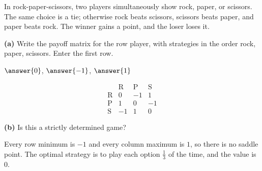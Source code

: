 \documentclass[12pt]{ximera}
\begin{document}
\begin{problem}
In rock-paper-scissors, two players simultaneously show rock, paper, or scissors. The same
choice is a tie; otherwise rock beats scissors, scissors beats paper, and paper beats rock.
The winner gains a point, and the loser loses it.

\begin{prompt}
\textbf{(a)} Write the payoff matrix for the row player, with strategies in the order
rock, paper, scissors. Enter the first row.

$\answer{0}$, $\answer{-1}$, $\answer{1}$
\begin{feedback}
\[
\begin{array}{r|rrr}
 & \text{R} & \text{P} & \text{S}\\\hline
\text{R} & 0 & -1 & 1\\
\text{P} & 1 & 0 & -1\\
\text{S} & -1 & 1 & 0
\end{array}
\]
\end{feedback}
\end{prompt}

\begin{prompt}
\textbf{(b)} Is this a strictly determined game?
\begin{multipleChoice}
\end{multipleChoice}
\begin{feedback}
Every row minimum is $-1$ and every column maximum is $1$, so there is no saddle point.
The optimal strategy is to play each option $\frac13$ of the time, and the value is $0$.
\end{feedback}
\end{prompt}
\end{problem}
\end{document}
